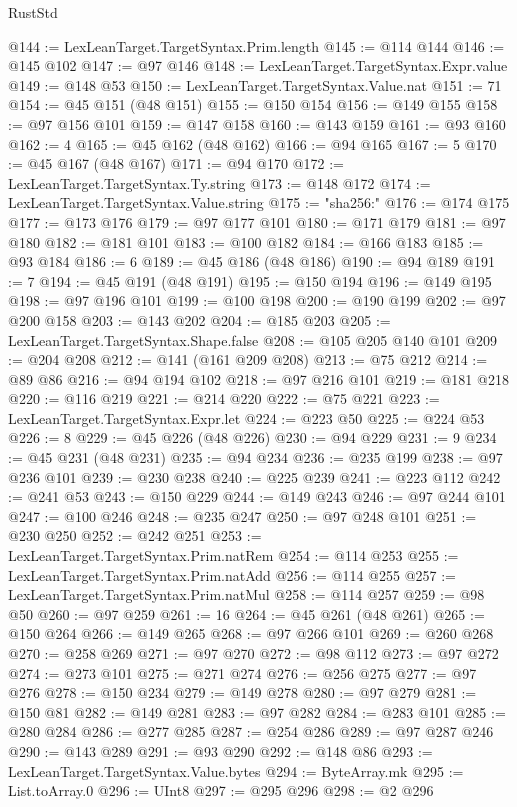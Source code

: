 \begin{lexlean}{RustStd}
\begin{coremodule}
@144 := LexLeanTarget.TargetSyntax.Prim.length
@145 := @114 @144
@146 := @145 @102
@147 := @97 @146
@148 := LexLeanTarget.TargetSyntax.Expr.value
@149 := @148 @53
@150 := LexLeanTarget.TargetSyntax.Value.nat
@151 := 71
@154 := @45 @151 (@48 @151)
@155 := @150 @154
@156 := @149 @155
@158 := @97 @156 @101
@159 := @147 @158
@160 := @143 @159
@161 := @93 @160
@162 := 4
@165 := @45 @162 (@48 @162)
@166 := @94 @165
@167 := 5
@170 := @45 @167 (@48 @167)
@171 := @94 @170
@172 := LexLeanTarget.TargetSyntax.Ty.string
@173 := @148 @172
@174 := LexLeanTarget.TargetSyntax.Value.string
@175 := "sha256:"
@176 := @174 @175
@177 := @173 @176
@179 := @97 @177 @101
@180 := @171 @179
@181 := @97 @180
@182 := @181 @101
@183 := @100 @182
@184 := @166 @183
@185 := @93 @184
@186 := 6
@189 := @45 @186 (@48 @186)
@190 := @94 @189
@191 := 7
@194 := @45 @191 (@48 @191)
@195 := @150 @194
@196 := @149 @195
@198 := @97 @196 @101
@199 := @100 @198
@200 := @190 @199
@202 := @97 @200 @158
@203 := @143 @202
@204 := @185 @203
@205 := LexLeanTarget.TargetSyntax.Shape.false
@208 := @105 @205 @140 @101
@209 := @204 @208
@212 := @141 (@161 @209 @208)
@213 := @75 @212
@214 := @89 @86
@216 := @94 @194 @102
@218 := @97 @216 @101
@219 := @181 @218
@220 := @116 @219
@221 := @214 @220
@222 := @75 @221
@223 := LexLeanTarget.TargetSyntax.Expr.let
@224 := @223 @50
@225 := @224 @53
@226 := 8
@229 := @45 @226 (@48 @226)
@230 := @94 @229
@231 := 9
@234 := @45 @231 (@48 @231)
@235 := @94 @234
@236 := @235 @199
@238 := @97 @236 @101
@239 := @230 @238
@240 := @225 @239
@241 := @223 @112
@242 := @241 @53
@243 := @150 @229
@244 := @149 @243
@246 := @97 @244 @101
@247 := @100 @246
@248 := @235 @247
@250 := @97 @248 @101
@251 := @230 @250
@252 := @242 @251
@253 := LexLeanTarget.TargetSyntax.Prim.natRem
@254 := @114 @253
@255 := LexLeanTarget.TargetSyntax.Prim.natAdd
@256 := @114 @255
@257 := LexLeanTarget.TargetSyntax.Prim.natMul
@258 := @114 @257
@259 := @98 @50
@260 := @97 @259
@261 := 16
@264 := @45 @261 (@48 @261)
@265 := @150 @264
@266 := @149 @265
@268 := @97 @266 @101
@269 := @260 @268
@270 := @258 @269
@271 := @97 @270
@272 := @98 @112
@273 := @97 @272
@274 := @273 @101
@275 := @271 @274
@276 := @256 @275
@277 := @97 @276
@278 := @150 @234
@279 := @149 @278
@280 := @97 @279
@281 := @150 @81
@282 := @149 @281
@283 := @97 @282
@284 := @283 @101
@285 := @280 @284
@286 := @277 @285
@287 := @254 @286
@289 := @97 @287 @246
@290 := @143 @289
@291 := @93 @290
@292 := @148 @86
@293 := LexLeanTarget.TargetSyntax.Value.bytes
@294 := ByteArray.mk
@295 := List.toArray.{0}
@296 := UInt8
@297 := @295 @296
@298 := @2 @296

\end{coremodule}
\end{lexlean}
